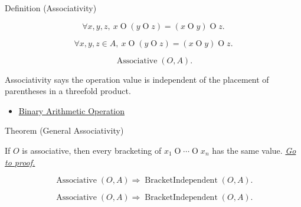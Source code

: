 \begin{definitionbox}{Definition (Associativity)}
\begin{definition}[Associativity]
\label{def:associativity}
\[
\forall x,y,z,\ x\mathbin{O}(y\mathbin{O}z)=(x\mathbin{O}y)\mathbin{O}z.
\]
\end{definition}
\end{definitionbox}

\begin{remark*}
\[
\forall x,y,z\in A,\ x\mathbin{O}(y\mathbin{O}z)=(x\mathbin{O}y)\mathbin{O}z.
\]
\end{remark*}

\begin{remark*}
\[
\operatorname{Associative}(O,A).
\]
\end{remark*}

\begin{remark*}[Interpretation]
Associativity says the operation value is independent of the placement of
parentheses in a threefold product.
\end{remark*}

\begin{dependencies}
\begin{itemize}
  \item \hyperref[def:binary-arithmetic-operation]{Binary Arithmetic Operation}
\end{itemize}
\end{dependencies}

\begin{theorembox}{Theorem (General Associativity)}
\begin{theorem}
\label{thm:general-associativity}
If $O$ is associative, then every bracketing of
$x_1\mathbin{O}\cdots\mathbin{O}x_n$ has the same value.
\hyperref[prf:general-associativity]{\textit{Go to proof.}}
\end{theorem}
\end{theorembox}

\begin{remark*}
\[
\operatorname{Associative}(O,A)
\Longrightarrow
\operatorname{BracketIndependent}(O,A).
\]
\end{remark*}

\begin{remark*}
\[
\operatorname{Associative}(O,A)
\Longrightarrow
\operatorname{BracketIndependent}(O,A).
\]
\end{remark*}

